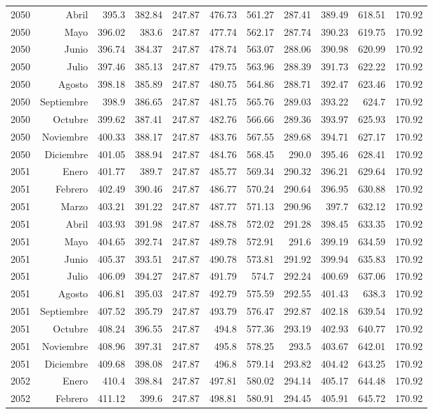 \documentclass{article}%
\begin{document}
\begin{longtable}{|l r|r|r|r|r|r|r|r|r|r|}
2050&Abril&395.3&382.84&247.87&476.73&561.27&287.41&389.49&618.51&170.92\\%
2050&Mayo&396.02&383.6&247.87&477.74&562.17&287.74&390.23&619.75&170.92\\%
2050&Junio&396.74&384.37&247.87&478.74&563.07&288.06&390.98&620.99&170.92\\%
2050&Julio&397.46&385.13&247.87&479.75&563.96&288.39&391.73&622.22&170.92\\%
2050&Agosto&398.18&385.89&247.87&480.75&564.86&288.71&392.47&623.46&170.92\\%
2050&Septiembre&398.9&386.65&247.87&481.75&565.76&289.03&393.22&624.7&170.92\\%
2050&Octubre&399.62&387.41&247.87&482.76&566.66&289.36&393.97&625.93&170.92\\%
2050&Noviembre&400.33&388.17&247.87&483.76&567.55&289.68&394.71&627.17&170.92\\%
2050&Diciembre&401.05&388.94&247.87&484.76&568.45&290.0&395.46&628.41&170.92\\%
2051&Enero&401.77&389.7&247.87&485.77&569.34&290.32&396.21&629.64&170.92\\%
2051&Febrero&402.49&390.46&247.87&486.77&570.24&290.64&396.95&630.88&170.92\\%
2051&Marzo&403.21&391.22&247.87&487.77&571.13&290.96&397.7&632.12&170.92\\%
2051&Abril&403.93&391.98&247.87&488.78&572.02&291.28&398.45&633.35&170.92\\%
2051&Mayo&404.65&392.74&247.87&489.78&572.91&291.6&399.19&634.59&170.92\\%
2051&Junio&405.37&393.51&247.87&490.78&573.81&291.92&399.94&635.83&170.92\\%
2051&Julio&406.09&394.27&247.87&491.79&574.7&292.24&400.69&637.06&170.92\\%
2051&Agosto&406.81&395.03&247.87&492.79&575.59&292.55&401.43&638.3&170.92\\%
2051&Septiembre&407.52&395.79&247.87&493.79&576.47&292.87&402.18&639.54&170.92\\%
2051&Octubre&408.24&396.55&247.87&494.8&577.36&293.19&402.93&640.77&170.92\\%
2051&Noviembre&408.96&397.31&247.87&495.8&578.25&293.5&403.67&642.01&170.92\\%
2051&Diciembre&409.68&398.08&247.87&496.8&579.14&293.82&404.42&643.25&170.92\\%
2052&Enero&410.4&398.84&247.87&497.81&580.02&294.14&405.17&644.48&170.92\\%
2052&Febrero&411.12&399.6&247.87&498.81&580.91&294.45&405.91&645.72&170.92\\%

\end{longtable}
\end{document}
